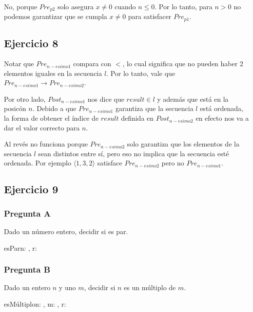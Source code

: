 No, porque $Pre_{p2}$ solo asegura $x \neq 0$ cuando $n \leq 0$. Por lo tanto, para $n > 0$ no podemos garantizar que se cumpla $x \neq 0$ para satisfacer $Pre_{p1}$.

\subsection{Ejercicio 8}

Notar que $Pre_{n-esimo1}$ compara con $<$, lo cual significa que no pueden haber 2 elementos iguales en la secuencia $l$. Por lo tanto, vale que $Pre_{n-esimo1} \rightarrow Pre_{n-esimo2}$.

Por otro lado, $Post_{n-esimo1}$ nos dice que $result \in l $ y además que está en la posicón $n$. Debido a que $Pre_{n-esimo1}$ garantiza que la secuencia $l$ está ordenada, la forma de obtener el índice de $result$ definida en $Post_{n-esimo2}$ en efecto nos va a dar el valor correcto para $n$.

Al revés no funciona porque $Pre_{n-esimo2}$ solo garantiza que los elementos de la secuencia $l$ sean distintos entre sí, pero eso no implica que la secuencia esté ordenada. Por ejemplo $\langle 1,3,2 \rangle$ satisface $Pre_{n-esimo2}$ pero no $Pre_{n-esimo1}$.

\subsection{Ejercicio 9}

\subsubsection{Pregunta A}

Dado un número entero, decidir si es par.

\begin{proc}{esPar}{\In n: \ent, \Out r: \bool}{}
\end{proc}

\subsubsection{Pregunta B}

Dado un entero $n$ y uno $m$, decidir si $n$ es un múltiplo de $m$.

\begin{proc}{esMúltiplo}{\In n: \ent, \In m: \ent, \Out r: \bool}{}
\end{proc}

